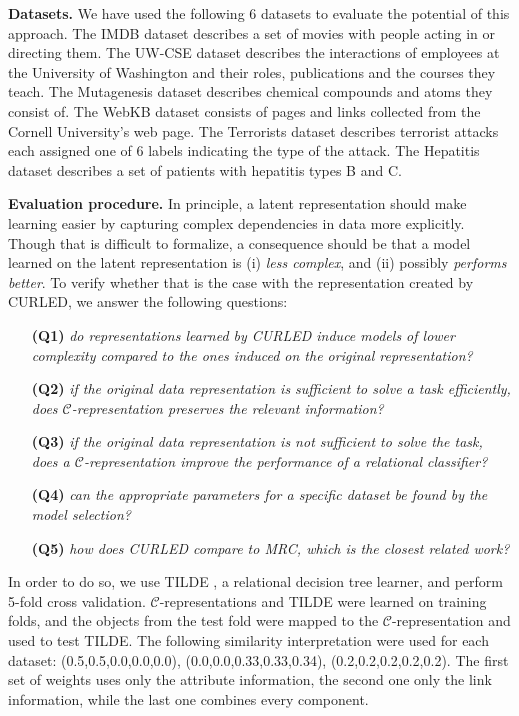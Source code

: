 \textbf{Datasets.}
We have used the following 6 datasets to evaluate the potential of this approach.
The IMDB dataset describes a set of movies with people acting in or directing them.
The UW-CSE dataset describes the interactions of employees at the University of Washington and their roles, publications and the courses they teach.
The Mutagenesis dataset describes chemical compounds and atoms they consist of. 
The WebKB dataset consists of pages and links collected from the Cornell University's web page.
The Terrorists dataset describes terrorist attacks each assigned one of 6 labels indicating the type of the attack.
The Hepatitis dataset describes a set of patients with hepatitis types B and C.
\vspace{1pt}

\textbf{Evaluation procedure.}
In principle, a latent representation should make learning easier by capturing complex dependencies in data more explicitly.
Though that is difficult to formalize, a consequence should be that a model learned on the latent representation is (i) \textit{less complex}, and (ii) possibly \textit{performs better}.
To verify whether that is the case with the representation created by CURLED, we answer the following questions:
\begin{itemize}
	\setlength\itemsep{0.06em}
    \item[\textbf{(Q1)}] \textit{do representations learned by CURLED induce models of lower complexity compared to the ones induced on the original representation?}
    \item[\textbf{(Q2)}] \textit{if the original data representation is sufficient to solve a task efficiently, does $\mathcal{C}$-representation preserves the relevant information?}
    \item[\textbf{(Q3)}] \textit{if the original data representation is not sufficient to solve the task, does a $\mathcal{C}$-representation improve the performance of a relational classifier?}
    \item[\textbf{(Q4)}] \textit{can the appropriate parameters for a specific dataset be found by the model selection?}
    \item[\textbf{(Q5)}] \textit{how does CURLED compare to MRC, which is the closest related work?}
\end{itemize}


In order to do so, we use TILDE \cite{Blockeel1998285}, a relational decision tree learner, and perform 5-fold cross validation. 
$\mathcal{C}$-representations and TILDE were learned on training folds, and the objects from the test fold were mapped to the $\mathcal{C}$-representation and used to test TILDE.
The following similarity interpretation were used for each dataset: (0.5,0.5,0.0,0.0,0.0), (0.0,0.0,0.33,0.33,0.34), (0.2,0.2,0.2,0.2,0.2).
The first set of weights uses only the attribute information, the second one only the link information, while the last one combines every component.



